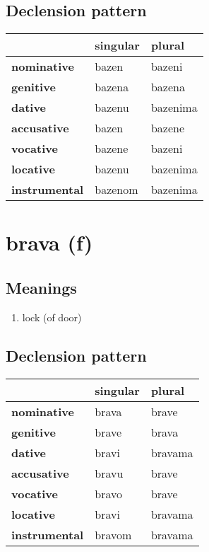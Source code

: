 \subsection*{Declension pattern}
\begin{tabularx}{\linewidth}{Xll}
\toprule
{} & singular &    plural \\
\midrule
\textbf{nominative  } &    bazen &    bazeni \\
\textbf{genitive    } &   bazena &    bazena \\
\textbf{dative      } &   bazenu &  bazenima \\
\textbf{accusative  } &    bazen &    bazene \\
\textbf{vocative    } &   bazene &    bazeni \\
\textbf{locative    } &   bazenu &  bazenima \\
\textbf{instrumental} &  bazenom &  bazenima \\
\bottomrule
\end{tabularx}

\filbreak
\section{brava (f)}
\subsection*{Meanings}
\begin{enumerate}
\item lock (of door)
\end{enumerate}
\subsection*{Declension pattern}
\begin{tabularx}{\linewidth}{Xll}
\toprule
{} & singular &   plural \\
\midrule
\textbf{nominative  } &    brava &    brave \\
\textbf{genitive    } &    brave &    brava \\
\textbf{dative      } &    bravi &  bravama \\
\textbf{accusative  } &    bravu &    brave \\
\textbf{vocative    } &    bravo &    brave \\
\textbf{locative    } &    bravi &  bravama \\
\textbf{instrumental} &   bravom &  bravama \\
\bottomrule
\end{tabularx}

